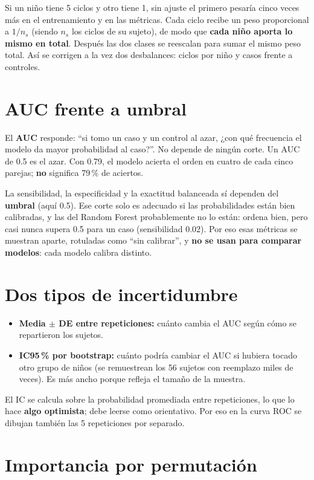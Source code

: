 \documentclass[11pt,a4paper]{article}
\newcommand{\termino}[1]{\textbf{#1}}
\begin{document}
Si un niño tiene 5 ciclos y otro tiene 1, sin ajuste el primero pesaría cinco veces más en el entrenamiento y en las métricas. Cada ciclo recibe un peso proporcional a $1/n_s$ (siendo $n_s$ los ciclos de su sujeto), de modo que \textbf{cada niño aporta lo mismo en total}. Después las dos clases se reescalan para sumar el mismo peso total. Así se corrigen a la vez dos desbalances: ciclos por niño y casos frente a controles.

\section{AUC frente a umbral}

El \termino{AUC} responde: ``si tomo un caso y un control al azar, ¿con qué frecuencia el modelo da mayor probabilidad al caso?''. No depende de ningún corte. Un AUC de 0.5 es el azar. Con 0.79, el modelo acierta el orden en cuatro de cada cinco parejas; \textbf{no} significa 79\,\% de aciertos.

La sensibilidad, la especificidad y la exactitud balanceada sí dependen del \termino{umbral} (aquí 0.5). Ese corte solo es adecuado si las probabilidades están bien calibradas, y las del Random Forest probablemente no lo están: ordena bien, pero casi nunca supera 0.5 para un caso (sensibilidad 0.02). Por eso esas métricas se muestran aparte, rotuladas como ``sin calibrar'', y \textbf{no se usan para comparar modelos}: cada modelo calibra distinto.

\section{Dos tipos de incertidumbre}

\begin{itemize}
\item \textbf{Media $\pm$ DE entre repeticiones:} cuánto cambia el AUC según cómo se repartieron los sujetos.
\item \textbf{IC95\,\% por bootstrap:} cuánto podría cambiar el AUC si hubiera tocado otro grupo de niños (se remuestrean los 56 sujetos con reemplazo miles de veces). Es más ancho porque refleja el tamaño de la muestra.
\end{itemize}

El IC se calcula sobre la probabilidad promediada entre repeticiones, lo que lo hace \textbf{algo optimista}; debe leerse como orientativo. Por eso en la curva ROC se dibujan también las 5 repeticiones por separado.

\section{Importancia por permutación}
\end{document}
